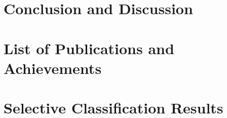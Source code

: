 \documentclass[12pt]{report}
\begin{document}
	
	\chapter{Conclusion and Discussion}
	\label{ch:conclusion_and_discussion}
	
	
	
	
	\clearpage
	\renewcommand{\bibname}{References}
	
	
	
	\begin{appendices}
		\chapter{List of Publications and Achievements}
		\label{app:list_of_publications}
		
		
		\chapter{Selective Classification Results}
		\label{app:selective_classification_results}
		
		
	\end{appendices}
	
\end{document}

